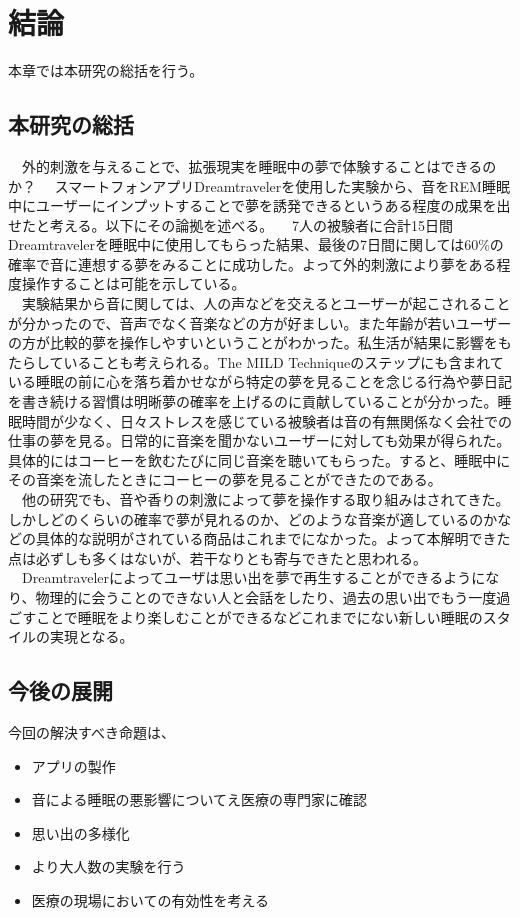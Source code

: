 \chapter{結論}
\label{chap:result}

本章では本研究の総括を行う。

\section{本研究の総括}
　外的刺激を与えることで、拡張現実を睡眠中の夢で体験することはできるのか？
　スマートフォンアプリDreamtravelerを使用した実験から、音をREM睡眠中にユーザーにインプットすることで夢を誘発できるというある程度の成果を出せたと考える。以下にその論拠を述べる。
　7人の被験者に合計15日間Dreamtravelerを睡眠中に使用してもらった結果、最後の7日間に関しては60\%の確率で音に連想する夢をみることに成功した。よって外的刺激により夢をある程度操作することは可能を示している。\\
　実験結果から音に関しては、人の声などを交えるとユーザーが起こされることが分かったので、音声でなく音楽などの方が好ましい。また年齢が若いユーザーの方が比較的夢を操作しやすいということがわかった。私生活が結果に影響をもたらしていることも考えられる。The MILD Techniqueのステップにも含まれている睡眠の前に心を落ち着かせながら特定の夢を見ることを念じる行為や夢日記を書き続ける習慣は明晰夢の確率を上げるのに貢献していることが分かった。睡眠時間が少なく、日々ストレスを感じている被験者は音の有無関係なく会社での仕事の夢を見る。日常的に音楽を聞かないユーザーに対しても効果が得られた。具体的にはコーヒーを飲むたびに同じ音楽を聴いてもらった。すると、睡眠中にその音楽を流したときにコーヒーの夢を見ることができたのである。\\
　他の研究でも、音や香りの刺激によって夢を操作する取り組みはされてきた。しかしどのくらいの確率で夢が見れるのか、どのような音楽が適しているのかなどの具体的な説明がされている商品はこれまでになかった。よって本解明できた点は必ずしも多くはないが、若干なりとも寄与できたと思われる。
　Dreamtravelerによってユーザは思い出を夢で再生することができるようになり、物理的に会うことのできない人と会話をしたり、過去の思い出でもう一度過ごすことで睡眠をより楽しむことができるなどこれまでにない新しい睡眠のスタイルの実現となる。

\section{今後の展開}
今回の解決すべき命題は、
\begin{itemize}
\item アプリの製作
\item 音による睡眠の悪影響についてえ医療の専門家に確認
\item 思い出の多様化
\item より大人数の実験を行う
\item 医療の現場においての有効性を考える
\end{itemize}

